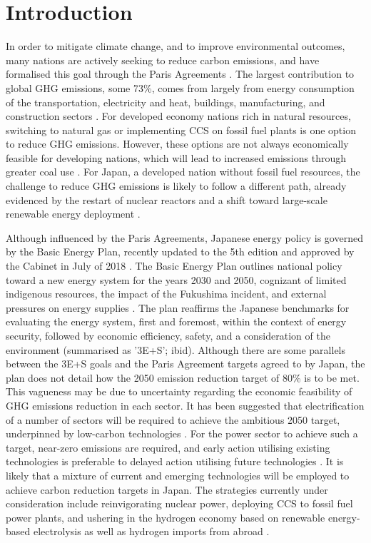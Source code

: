 \section{Introduction} \label{Introduction}
In order to mitigate climate change, and to improve environmental outcomes, many nations are actively seeking to reduce carbon emissions, and have formalised this goal through the Paris Agreements \cite{united_nations_framework_convention_on_climate_change_unfccc_submission_2015}. The largest contribution to global \gls{GHG} emissions, some 73\%, comes from largely from energy consumption of the transportation, electricity and heat, buildings, manufacturing, and construction sectors \cite{ge_4_2020}. For developed economy nations rich in natural resources, switching to natural gas or implementing \gls{CCS} on fossil fuel plants is one option to reduce GHG emissions. However, these options are not always economically feasible for developing nations, which will lead to increased emissions through greater coal use \cite{international_energy_agency_latest_2019}. For Japan, a developed nation without fossil fuel resources, the challenge to reduce GHG emissions is likely to follow a different path, already evidenced by the restart of nuclear reactors and a shift toward large-scale renewable energy deployment \cite{international_energy_agency_latest_2019}.

Although influenced by the Paris Agreements, Japanese energy policy is governed by the Basic Energy Plan, recently updated to the 5th edition and approved by the Cabinet in July of 2018 \cite{noauthor_japans_2018}. The Basic Energy Plan outlines national policy toward a new energy system for the years 2030 and 2050, cognizant of limited indigenous resources, the impact of the Fukushima incident, and external pressures on energy supplies \cite{meti_annual_2018}. The plan reaffirms the Japanese benchmarks for evaluating the energy system, first and foremost, within the context of energy security, followed by economic efficiency, safety, and a consideration of the environment (summarised as '3E+S'; ibid). Although there are some parallels between the 3E+S goals and the Paris Agreement targets agreed to by Japan, the plan does not detail how the 2050 emission reduction target of 80\% is to be met. This vagueness may be due to uncertainty regarding the economic feasibility of GHG emissions reduction in each sector. It has been suggested that electrification of a number of sectors will be required to achieve the ambitious 2050 target, underpinned by low-carbon technologies \cite{matsuo_quantitative_2018}. For the power sector to achieve such a target, near-zero emissions are required, and early action utilising existing technologies is preferable to delayed action utilising future technologies \cite{ashina_roadmap_2012}. It is likely that a mixture of current and emerging technologies will be employed to achieve carbon reduction targets in Japan. The strategies currently under consideration include reinvigorating nuclear power, deploying \gls{CCS} to fossil fuel power plants, and ushering in the hydrogen economy based on renewable energy-based electrolysis as well as hydrogen imports from abroad \cite{ashina_roadmap_2012, matsuo_quantitative_2018, noauthor_basic_2017}. 

